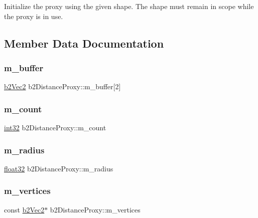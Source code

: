 Initialize the proxy using the given shape. The shape must remain in scope while the proxy is in use. 

\subsection{Member Data Documentation}
\mbox{\label{structb2_distance_proxy_a3fc5ebfa3d34ac66390b88f9277fb330}} 
\subsubsection{\texorpdfstring{m\_buffer}{m\_buffer}}
{\footnotesize\ttfamily \mbox{\hyperlink{structb2_vec2}{b2\+Vec2}} b2\+Distance\+Proxy\+::m\+\_\+buffer\mbox{[}2\mbox{]}}

\mbox{\label{structb2_distance_proxy_ae36efab1361bb1f94e32f9b956c6f1b3}} 
\subsubsection{\texorpdfstring{m\_count}{m\_count}}
{\footnotesize\ttfamily \mbox{\hyperlink{b2_settings_8h_a43d43196463bde49cb067f5c20ab8481}{int32}} b2\+Distance\+Proxy\+::m\+\_\+count}

\mbox{\label{structb2_distance_proxy_a459c93f35b1e62d583bd73d8c478ce89}} 
\subsubsection{\texorpdfstring{m\_radius}{m\_radius}}
{\footnotesize\ttfamily \mbox{\hyperlink{b2_settings_8h_aacdc525d6f7bddb3ae95d5c311bd06a1}{float32}} b2\+Distance\+Proxy\+::m\+\_\+radius}

\mbox{\label{structb2_distance_proxy_abaf1495b8214b74d944b57170a762f32}} 
\subsubsection{\texorpdfstring{m\_vertices}{m\_vertices}}
{\footnotesize\ttfamily const \mbox{\hyperlink{structb2_vec2}{b2\+Vec2}}$\ast$ b2\+Distance\+Proxy\+::m\+\_\+vertices}



